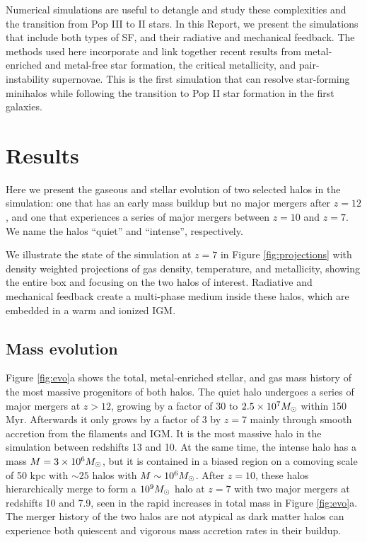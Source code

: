 \documentclass[12pt]{article}
\newcommand{\Ms}{\ifmmode{M_\odot}\else{$M_\odot$}\fi}
\begin{document}
Numerical simulations are useful to detangle and study these
complexities and the transition from Pop III to II stars.  In this
Report, we present the simulations that include both types of SF, and
their radiative and mechanical feedback.  The methods used here
incorporate and link together recent results from metal-enriched and
metal-free star formation, the critical metallicity, and
pair-instability supernovae.  This is the first simulation that can
resolve star-forming minihalos while following the transition to Pop
II star formation in the first galaxies.

\section*{Results}
\label{sec:results}

Here we present the gaseous and stellar evolution of two selected
halos in the simulation: one that has an early mass buildup but no
major mergers after $z=12$, and one that experiences a series of major
mergers between $z=10$ and $z=7$.  We name the halos ``quiet'' and
``intense'', respectively.  


We illustrate the state of the simulation at $z=7$ in Figure
\ref{fig:projections} with density weighted projections of gas
density, temperature, and metallicity, showing the entire box and
focusing on the two halos of interest.  Radiative and mechanical
feedback create a multi-phase medium inside these halos, which are
embedded in a warm and ionized IGM.

\subsection*{Mass evolution}
\label{sec:halo}


Figure \ref{fig:evo}a shows the total, metal-enriched stellar, and gas
mass history of the most massive progenitors of both halos.  The quiet
halo undergoes a series of major mergers at $z > 12$, growing by a
factor of 30 to $2.5 \times 10^7 \Ms$ within 150 Myr.  Afterwards it
only grows by a factor of 3 by $z=7$ mainly through smooth accretion
from the filaments and IGM.  It is the most massive halo in the
simulation between redshifts 13 and 10.  At the same time, the intense
halo has a mass $M = 3 \times 10^6 \Ms$, but it is contained in a
biased region on a comoving scale of 50 kpc with $\sim25$ halos with
$M \sim 10^6 \Ms$.  After $z=10$, these halos hierarchically merge to
form a $10^9 \Ms$ halo at $z=7$ with two major mergers at redshifts 10
and 7.9, seen in the rapid increases in total mass in Figure
\ref{fig:evo}a.  The merger history of the two halos are not atypical
as dark matter halos can experience both quiescent and vigorous mass
accretion rates in their buildup.
\end{document}
